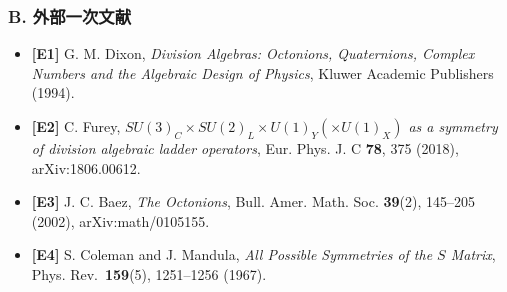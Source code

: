 \documentclass[
  a4paper,
]{ltjsarticle}
\providecommand{\tightlist}{%
  \setlength{\itemsep}{0pt}\setlength{\parskip}{0pt}}
\begin{document}
\subsubsection{B.
外部一次文献}\label{b.-ux5916ux90e8ux4e00ux6b21ux6587ux732e}

\begin{itemize}
\tightlist
\item
  \textbf{{[}E1{]}} G. M. Dixon, \emph{Division Algebras: Octonions,
  Quaternions, Complex Numbers and the Algebraic Design of Physics},
  Kluwer Academic Publishers (1994).
\item
  \textbf{{[}E2{]}} C. Furey,
  \emph{\(SU(3)_C \times SU(2)_L \times U(1)_Y (\times U(1)_X)\) as a
  symmetry of division algebraic ladder operators}, Eur. Phys. J. C
  \textbf{78}, 375 (2018), arXiv:1806.00612.
\item
  \textbf{{[}E3{]}} J. C. Baez, \emph{The Octonions}, Bull. Amer. Math.
  Soc. \textbf{39}(2), 145--205 (2002), arXiv:math/0105155.
\item
  \textbf{{[}E4{]}} S. Coleman and J. Mandula, \emph{All Possible
  Symmetries of the \(S\) Matrix}, Phys. Rev.~\textbf{159}(5),
  1251--1256 (1967).
\end{itemize}
\end{document}
